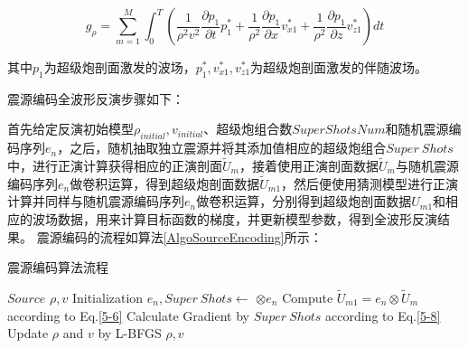 \documentclass[12pt]{article}
\renewcommand{\algorithmicrequire}{\textbf{参数说明:}}
\renewcommand{\algorithmicensure}{\textbf{输出:}}
\begin{document}
\begin{equation}\label{5-8}
g_{\rho}=\sum_{m=1}^M \int_0^T (\frac{1}{\rho^2 v^2}\frac{\partial p_1}{\partial t}p_1^*+\frac{1}{\rho^2}\frac{\partial p_1}{\partial x}v_{x1}^*+\frac{1}{\rho^2}\frac{\partial p_1}{\partial z}v_{z1}^*)dt
\end{equation}
\par
其中$p_1$为超级炮剖面激发的波场，$p_1^*,v_{x1}^*,v_{z1}^*$为超级炮剖面激发的伴随波场。
\par
震源编码全波形反演步骤如下：
\par
首先给定反演初始模型$\rho_{initial},v_{initial}$、超级炮组合数$SuperShotsNum$和随机震源编码序列$e_n$，之后，随机抽取独立震源并将其添加值相应的超级炮组合$Super\ Shots$中，进行正演计算获得相应的正演剖面$\tilde{U}_m$，接着使用正演剖面数据$\tilde{U}_m$与随机震源编码序列$e_n$做卷积运算，得到超级炮剖面数据$\tilde{U}_{m1}$，然后便使用猜测模型进行正演计算并同样与随机震源编码序列$e_n$做卷积运算，分别得到超级炮剖面数据$U_{m1}$和相应的波场数据，用来计算目标函数的梯度，并更新模型参数，得到全波形反演结果。
震源编码的流程如算法\ref{AlgoSourceEncoding}所示：
\begin{algorithm}[H]
\caption{震源编码算法流程}
\label{AlgoSourceEncoding}
\renewcommand{\algorithmicrequire}{\textbf{输入:}}
\renewcommand{\algorithmicensure}{\textbf{输出:}}
\begin{algorithmic}[1]
\Require
$Source$
\Ensure
$\rho,v$
\State Initialization $e_n,Super\ Shots \gets$ $\otimes e_n$ 
\State Compute $\tilde{U}_{m1}=e_n \otimes \tilde{U}_m$ according to Eq.\ref{5-6}
\State Calculate Gradient by $Super\ Shots$ according to Eq.\ref{5-8}
\State Update $\rho$ and $v$ by L-BFGS 
\EndFor
\State \Return $\rho,v$
\end{algorithmic}
\end{algorithm}
\par
\end{document}
